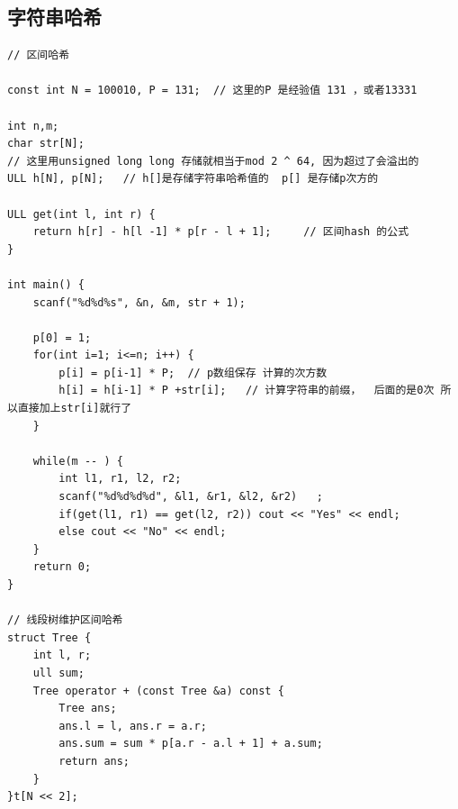 \documentclass[twoside]{article}
\begin{document}
\subsection{字符串哈希}
\begin{lstlisting}
// 区间哈希

const int N = 100010, P = 131;  // 这里的P 是经验值 131 ，或者13331

int n,m;
char str[N];
// 这里用unsigned long long 存储就相当于mod 2 ^ 64, 因为超过了会溢出的
ULL h[N], p[N];   // h[]是存储字符串哈希值的  p[] 是存储p次方的  

ULL get(int l, int r) {
    return h[r] - h[l -1] * p[r - l + 1];     // 区间hash 的公式
}

int main() {
    scanf("%d%d%s", &n, &m, str + 1);

    p[0] = 1;
    for(int i=1; i<=n; i++) {
        p[i] = p[i-1] * P;  // p数组保存 计算的次方数
        h[i] = h[i-1] * P +str[i];   // 计算字符串的前缀，  后面的是0次 所以直接加上str[i]就行了
    }

    while(m -- ) {
        int l1, r1, l2, r2;
        scanf("%d%d%d%d", &l1, &r1, &l2, &r2)   ;
        if(get(l1, r1) == get(l2, r2)) cout << "Yes" << endl;
        else cout << "No" << endl;
    }
    return 0;
}

// 线段树维护区间哈希
struct Tree {
    int l, r;
    ull sum;
    Tree operator + (const Tree &a) const {
        Tree ans;
        ans.l = l, ans.r = a.r;
        ans.sum = sum * p[a.r - a.l + 1] + a.sum;
        return ans;
    }
}t[N << 2];
\end{lstlisting}
\end{document}
